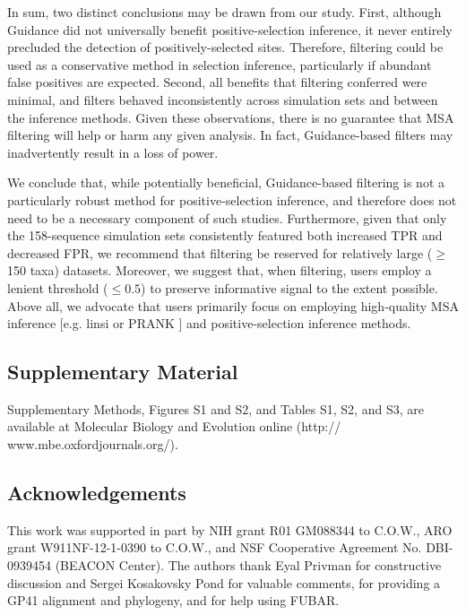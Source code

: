 \documentclass[11pt]{article}
\begin{document}
In sum, two distinct conclusions may be drawn from our study. First, although Guidance did not universally benefit positive-selection inference, it never entirely precluded the detection of positively-selected sites. Therefore, filtering could be used as a conservative method in selection inference, particularly if abundant false positives are expected. Second, all benefits that filtering conferred were minimal, and filters behaved inconsistently across simulation sets and between the inference methods. Given these observations, there is no guarantee that MSA filtering will help or harm any given analysis. In fact, Guidance-based filters may inadvertently result in a loss of power. 

We conclude that, while potentially beneficial, Guidance-based filtering is not a particularly robust method for positive-selection inference, and therefore does not need to be a necessary component of such studies. Furthermore, given that only the 158-sequence simulation sets consistently featured both increased TPR and decreased FPR, we recommend that filtering be reserved for relatively large ($\geq$ 150 taxa) datasets. Moreover, we suggest that, when filtering, users employ a lenient threshold ($\leq0.5$) to preserve informative signal to the extent possible. Above all, we advocate that users primarily focus on employing high-quality MSA inference [e.g. linsi \citep{Katoh2005} or PRANK \citep{Loytynoja2008}] and positive-selection inference methods. 


\subsection*{Supplementary Material}
Supplementary Methods, Figures S1 and S2, and Tables S1, S2, and S3, are available at Molecular Biology and Evolution online (http:// www.mbe.oxfordjournals.org/).


\subsection*{Acknowledgements}
 This work was supported in part by NIH grant R01 GM088344 to C.O.W., ARO grant W911NF-12-1-0390 to  C.O.W.,  and NSF Cooperative Agreement No. DBI-0939454 (BEACON Center). The authors thank Eyal Privman for constructive discussion and Sergei Kosakovsky Pond for valuable comments, for providing a GP41 alignment and phylogeny, and for help using FUBAR.


%
%	
\newpage
\end{document}
